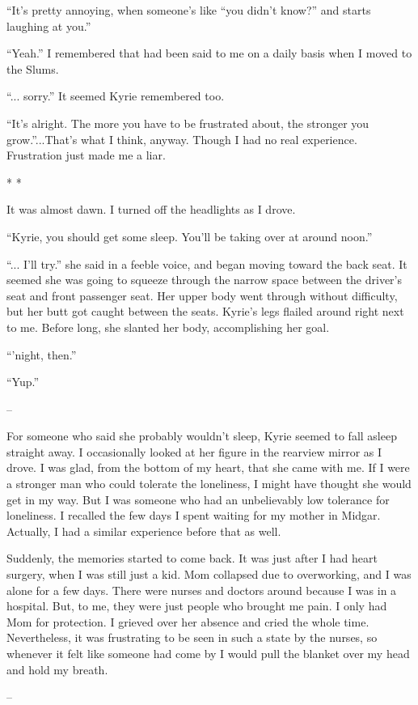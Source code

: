 \documentclass[oneside]{book}
\begin{document}
“It’s pretty annoying, when someone’s like “you didn’t know?” and starts laughing at you.”

“Yeah.” I remembered that had been said to me on a daily basis when I moved to the Slums.

“... sorry.” It seemed Kyrie remembered too.

“It’s alright. The more you have to be frustrated about, the stronger you grow.”...That’s what I think, anyway. Though I had no real experience. Frustration just made me a liar.

* *

It was almost dawn. I turned off the headlights as I drove.

“Kyrie, you should get some sleep. You’ll be taking over at around noon.”

“... I’ll try.” she said in a feeble voice, and began moving toward the back seat. It seemed she was going to squeeze through the narrow space between the driver’s seat and front passenger seat. Her upper body went through without difficulty, but her butt got caught between the seats. Kyrie’s legs flailed around right next to me. Before long, she slanted her body, accomplishing her goal.

“’night, then.”

“Yup.”

–

For someone who said she probably wouldn’t sleep, Kyrie seemed to fall asleep straight away. I occasionally looked at her figure in the rearview mirror as I drove. I was glad, from the bottom of my heart, that she came with me. If I were a stronger man who could tolerate the loneliness, I might have thought she would get in my way. But I was someone who had an unbelievably low tolerance for loneliness. I recalled the few days I spent waiting for my mother in Midgar. Actually, I had a similar experience before that as well.

Suddenly, the memories started to come back. It was just after I had heart surgery, when I was still just a kid. Mom collapsed due to overworking, and I was alone for a few days. There were nurses and doctors around because I was in a hospital. But, to me, they were just people who brought me pain. I only had Mom for protection. I grieved over her absence and cried the whole time. Nevertheless, it was frustrating to be seen in such a state by the nurses, so whenever it felt like someone had come by I would pull the blanket over my head and hold my breath.

–
\end{document}
